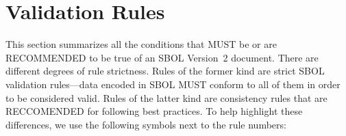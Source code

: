 \newcommand{\printValid}{\validRule{sbol-\arabic{sbolCtr}\addtocounter{sbolCtr}{1}}}
\newcommand{\printWarning}{\consistencyRule{sbol-\arabic{sbolCtr}\addtocounter{sbolCtr}{1}}}
\newcommand{\printModeling}{\modelingRule{sbol-\arabic{sbolCtr}\addtocounter{sbolCtr}{1}}}

\section{Validation Rules}
\label{validation}



This section summarizes all the conditions that MUST be or 
are RECOMMENDED to be true of an SBOL Version~2 document.  
There are different degrees of rule strictness.  
Rules of the former kind are strict SBOL validation rules---data encoded in SBOL MUST conform to
all of them in order to be considered valid.  Rules of the latter kind
are consistency rules that are RECCOMENDED for following best practices.  To help highlight these differences, we use the
following symbols next to the rule numbers:

